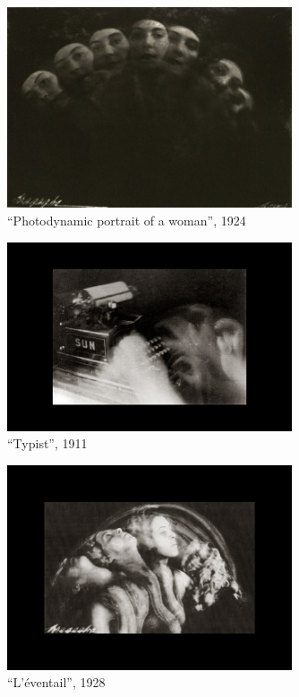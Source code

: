 \documentclass[
  french,
]{book}
\begin{document}
\begin{figure}
\centering
\includegraphics[width=0.75\textwidth,height=\textheight]{medias/corpus/bragaglia/Anton-Giulio-Bragaglia-fotodinamica-11.jpg}
\caption{``Photodynamic portrait of a woman'', 1924}
\end{figure}

\begin{figure}
\centering
\includegraphics[width=0.75\textwidth,height=\textheight]{medias/corpus/bragaglia/Anton-Giulio-Bragaglia-fotodinamica-12.jpg}
\caption{``Typist'', 1911}
\end{figure}

\begin{figure}
\centering
\includegraphics[width=0.75\textwidth,height=\textheight]{medias/corpus/bragaglia/Anton-Giulio-Bragaglia-fotodinamica-13.jpg}
\caption{``L'éventail'', 1928}
\end{figure}
\end{document}
